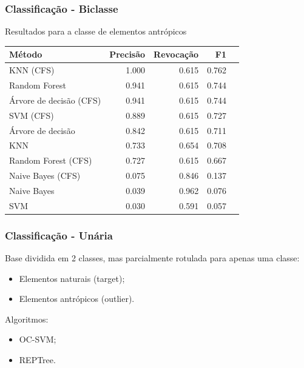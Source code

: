 \documentclass[t]{beamer}
\begin{document}
\begin{frame}[c]
	\frametitle{Classificação - Biclasse}

	\centering
	Resultados para a classe de elementos antrópicos

	\small{
		\begin{table}[h]
		\centering
		\begin{tabulary}{\linewidth}{|L|R|R|R|R|}
		\hline
		\textbf{Método} & \textbf{Precisão} & \textbf{Revocação} & \textbf{F1} \\ \hline
		KNN (CFS)               & 1.000 & 0.615 & 0.762 \\ \hline
		Random Forest           & 0.941 & 0.615 & 0.744 \\ \hline
		Árvore de decisão (CFS) & 0.941 & 0.615 & 0.744 \\ \hline
		SVM (CFS)               & 0.889 & 0.615 & 0.727 \\ \hline
		Árvore de decisão       & 0.842 & 0.615 & 0.711 \\ \hline
		KNN                     & 0.733 & 0.654 & 0.708 \\ \hline
		Random Forest (CFS)     & 0.727 & 0.615 & 0.667 \\ \hline
		Naive Bayes (CFS)       & 0.075 & 0.846 & 0.137 \\ \hline
		Naive Bayes             & 0.039 & 0.962 & 0.076 \\ \hline
		SVM                     & 0.030 & 0.591 & 0.057 \\ \hline
		\end{tabulary}
		\end{table}
	}
\end{frame}

\begin{frame}[c]
	\frametitle{Classificação - Unária}

	Base dividida em 2 classes, mas parcialmente rotulada para apenas uma classe:
	\vspace{0.3cm}
	\begin{itemize}
		\item Elementos naturais (target);
		\item Elementos antrópicos (outlier).
	\end{itemize}

	\vspace{0.5cm}

	Algoritmos:
	\begin{itemize}
		\item OC-SVM;
		\item REPTree.
	\end{itemize}

\end{frame}
\end{document}

